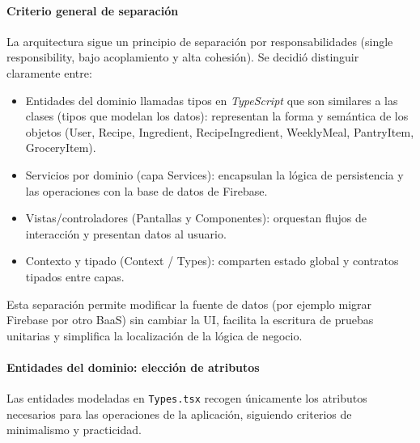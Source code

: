 \documentclass[twoside, openright, 11pt]{report}
\begin{document}
		\paragraph{Criterio general de separación}
		La arquitectura sigue un principio de separación por responsabilidades (single responsibility, bajo acoplamiento y alta cohesión). Se decidió distinguir claramente entre:
		\begin{itemize}
			\item Entidades del dominio llamadas tipos en \textit{TypeScript} que son similares a las clases (tipos que modelan los datos): representan la forma y semántica de los objetos (User, Recipe, Ingredient, RecipeIngredient, WeeklyMeal, PantryItem, GroceryItem).
			\item Servicios por dominio (capa Services): encapsulan la lógica de persistencia y las operaciones con la base de datos de Firebase.
			\item Vistas/controladores (Pantallas y Componentes): orquestan flujos de interacción y presentan datos al usuario.
			\item Contexto y tipado (Context / Types): comparten estado global y contratos tipados entre capas.
		\end{itemize}
		Esta separación permite modificar la fuente de datos (por ejemplo migrar Firebase por otro BaaS) sin cambiar la UI, facilita la escritura de pruebas unitarias y simplifica la localización de la lógica de negocio.
		
		\paragraph{Entidades del dominio: elección de atributos}
		Las entidades modeladas en \texttt{Types.tsx} recogen únicamente los atributos necesarios para las operaciones de la aplicación, siguiendo criterios de minimalismo y practicidad.
		
\end{document}
